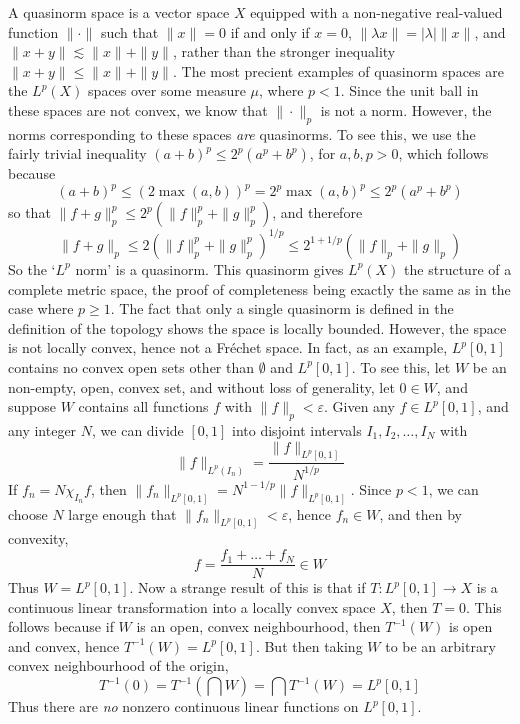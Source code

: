 \begin{example}
    A quasinorm space is a vector space $X$ equipped with a non-negative real-valued function $\| \cdot \|$ such that $\| x \| = 0$ if and only if $x = 0$, $\| \lambda x \| = |\lambda| \| x \|$, and $\| x + y \| \lesssim \|x\| + \|y\|$, rather than the stronger inequality $\| x + y \| \leq \| x \| + \| y \|$. The most precient examples of quasinorm spaces are the $L^p(X)$ spaces over some measure $\mu$, where $p < 1$. Since the unit ball in these spaces are not convex, we know that $\| \cdot \|_p$ is not a norm. However, the norms corresponding to these spaces {\it are} quasinorms. To see this, we use the fairly trivial inequality $(a + b)^p \leq 2^p(a^p + b^p)$, for $a,b,p > 0$, which follows because
    \[ (a + b)^p \leq (2 \max(a,b))^p = 2^p \max(a,b)^p \leq 2^p(a^p + b^p) \]
    so that $\| f + g \|_p^p \leq 2^p ( \| f \|_p^p + \| g \|_p^p )$, and therefore
    \[ \| f + g \|_p \leq 2 ( \| f \|_p^p + \| g \|_p^p )^{1/p} \leq 2^{1 + 1/p} ( \| f \|_p + \| g \|_p ) \]
    So the `$L^p$ norm' is a quasinorm. This quasinorm gives $L^p(X)$ the structure of a complete metric space, the proof of completeness being exactly the same as in the case where $p \geq 1$. The fact that only a single quasinorm is defined in the definition of the topology shows the space is locally bounded.  However, the space is not locally convex, hence not a Fr\'{e}chet space. In fact, as an example, $L^p[0,1]$ contains no convex open sets other than $\emptyset$ and $L^p[0,1]$. To see this, let $W$ be an non-empty, open, convex set, and without loss of generality, let $0 \in W$, and suppose $W$ contains all functions $f$ with $\| f \|_p < \varepsilon$. Given any $f \in L^p[0,1]$, and any integer $N$, we can divide $[0,1]$ into disjoint intervals $I_1, I_2, \dots, I_N$ with
    \[ \| f \|_{L^p(I_n)} = \frac{\| f \|_{L^p[0,1]}}{N^{1/p}} \]
    If $f_n = N \chi_{I_n} f$, then $\| f_n \|_{L^p[0,1]} = N^{1-1/p} \| f \|_{L^p[0,1]}$. Since $p < 1$, we can choose $N$ large enough that $\| f_n \|_{L^p[0,1]} < \varepsilon$, hence $f_n \in W$, and then by convexity,
    \[ f = \frac{f_1 + \dots + f_N}{N} \in W \]
    Thus $W = L^p[0,1]$. Now a strange result of this is that if $T: L^p[0,1] \to X$ is a continuous linear transformation into a locally convex space $X$, then $T = 0$. This follows because if $W$ is an open, convex neighbourhood, then $T^{-1}(W)$ is open and convex, hence $T^{-1}(W) = L^p[0,1]$. But then taking $W$ to be an arbitrary convex neighbourhood of the origin,
    \[ T^{-1}(0) = T^{-1} \left( \bigcap W \right) = \bigcap T^{-1}(W) = L^p[0,1] \]
    Thus there are {\it no} nonzero continuous linear functions on $L^p[0,1]$.
\end{example}

